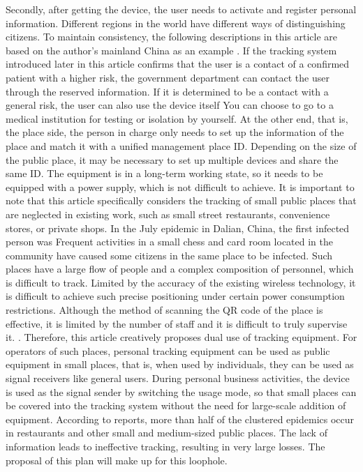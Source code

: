 \documentclass[conference]{IEEEtran}
\begin{document}
\par Secondly, after getting the device, the user needs to activate and register personal information. Different regions in the world have different ways of distinguishing citizens. To maintain consistency, the following descriptions in this article are based on the author's mainland China as an example . If the tracking system introduced later in this article confirms that the user is a contact of a confirmed patient with a higher risk, the government department can contact the user through the reserved information. If it is determined to be a contact with a general risk, the user can also use the device itself You can choose to go to a medical institution for testing or isolation by yourself. At the other end, that is, the place side, the person in charge only needs to set up the information of the place and match it with a unified management place ID. Depending on the size of the public place, it may be necessary to set up multiple devices and share the same ID. The equipment is in a long-term working state, so it needs to be equipped with a power supply, which is not difficult to achieve. It is important to note that this article specifically considers the tracking of small public places that are neglected in existing work, such as small street restaurants, convenience stores, or private shops. In the July epidemic in Dalian, China, the first infected person was Frequent activities in a small chess and card room located in the community have caused some citizens in the same place to be infected. Such places have a large flow of people and a complex composition of personnel, which is difficult to track. Limited by the accuracy of the existing wireless technology, it is difficult to achieve such precise positioning under certain power consumption restrictions. Although the method of scanning the QR code of the place is effective, it is limited by the number of staff and it is difficult to truly supervise it. . Therefore, this article creatively proposes dual use of tracking equipment. For operators of such places, personal tracking equipment can be used as public equipment in small places, that is, when used by individuals, they can be used as signal receivers like general users. During personal business activities, the device is used as the signal sender by switching the usage mode, so that small places can be covered into the tracking system without the need for large-scale addition of equipment. According to reports, more than half of the clustered epidemics occur in restaurants and other small and medium-sized public places. The lack of information leads to ineffective tracking, resulting in very large losses. The proposal of this plan will make up for this loophole.
\end{document}
